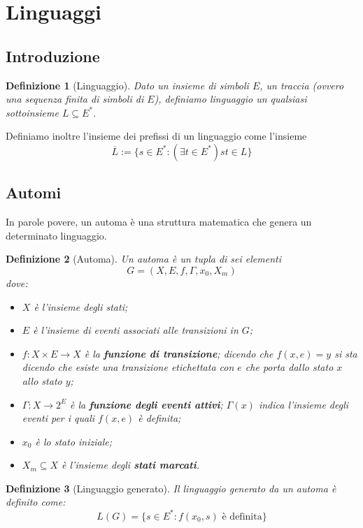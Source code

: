 \documentclass[a4paper, 11pt]{article}
\newtheorem{definit}{Definizione}[subsection]
\begin{document}
\section{Linguaggi}
\subsection{Introduzione}

\begin{definit}[Linguaggio]
	Dato un insieme di simboli $E$, un traccia (ovvero una sequenza finita di simboli di $E$), definiamo linguaggio un qualsiasi sottoinsieme $L \subseteq E^\ast$.
\end{definit}

Definiamo inoltre l'insieme dei prefissi di un linguaggio come l'insieme \[ \overline{L} := \lbrace s \in E^\ast : (\exists t \in E^\ast) st \in L \rbrace \]

\subsection{Automi}

In parole povere, un automa è una struttura matematica che genera un determinato linguaggio.
\begin{definit}[Automa]
	Un automa è un tupla di sei elementi \[ G = (X,E,f,\Gamma,x_0,X_m) \] dove: \begin{itemize}
		\item $X$ è l'insieme degli stati;
		\item $E$ è l'insieme di eventi associati alle transizioni in $G$;
		\item $f:X \times E \to X$ è la \textbf{funzione di transizione}; dicendo che $f(x,e) = y$ si sta dicendo che esiste una transizione etichettata con $e$ che porta dallo stato $x$ allo stato $y$;
		\item $\Gamma: X \to 2^E$ è la \textbf{funzione degli eventi attivi}; $\Gamma(x)$ indica l'insieme degli eventi per i quali $f(x,e)$ è definita;
		\item $x_0$ è lo stato iniziale;
		\item $X_m \subseteq X$ è l'insieme degli \textbf{stati marcati}.
	\end{itemize}
\end{definit}

\begin{definit}[Linguaggio generato]
	Il linguaggio generato da un automa è definito come: \[ L(G) = \lbrace s \in E^\ast : f(x_0,s) \text{ è definita} \rbrace \]
\end{definit}
\end{document}
